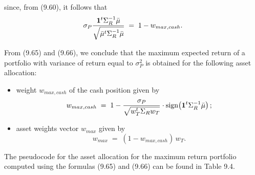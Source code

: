 %

since, from (9.60), it follows that
\[
\sigma_P\frac{\mathbf{1}^t\Sigma_R^{-1}\bar\mu}{\sqrt{\bar\mu^t\Sigma_R^{-1}\bar\mu}} \;=\;
1-w_{max,cash}.
\]

From (9.65) and (9.66), we conclude that the maximum expected return of a portfolio
with variance of return equal to $\sigma_P^2$ is obtained for the following asset
allocation:
\begin{itemize}
\item weight $w_{max,cash}$ of the cash position given by
\begin{equation}
w_{max,cash} \;=\; 1-\frac{\sigma_P}{\sqrt{w_T^t\Sigma_Rw_T}}\cdot
\operatorname{sign}\!\left(\mathbf{1}^t\Sigma_R^{-1}\bar\mu\right);
\end{equation}
\item asset weights vector $w_{max}$ given by
\begin{equation}
w_{max} \;=\; (1-w_{max,cash})\,w_T.
\end{equation}
\end{itemize}

The pseudocode for the asset allocation for the maximum return portfolio computed
using the formulas (9.65) and (9.66) can be found in Table 9.4.

